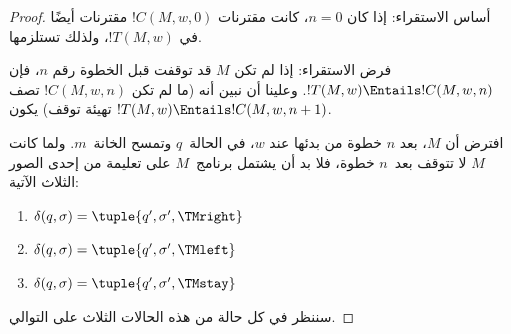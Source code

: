 \documentclass[../../../include/open-logic-section]{subfiles}
\begin{document}
\begin{proof}
أساس الاستقراء: إذا كان $n=0$، كانت مقترنات $!C(M,w,0)$ مقترنات
أيضًا في $!T(M,w)$، ولذلك تستلزمها.

فرض الاستقراء: إذا لم تكن $M$ قد توقفت قبل الخطوة رقم $n$، فإن
$!T(M,w)\Entails !C(M,w,n)$. وعلينا أن نبين أنه (ما لم تكن
$!C(M,w,n)$ تصف تهيئة توقف) يكون
$!T(M,w)\Entails !C(M,w,n+1)$.

افترض أن $M$، بعد $n$ خطوة من بدئها عند $w$، في الحالة~$q$ وتمسح
الخانة~$m$. ولما كانت $M$ لا تتوقف بعد~$n$ خطوة، فلا بد أن يشتمل
برنامج~$M$ على تعليمة من إحدى الصور الثلاث الآتية:

\begin{enumerate}
\item {} $\delta(q, \sigma) = \tuple{q', \sigma', \TMright}$

\item {} $\delta(q, \sigma) = \tuple{q', \sigma', \TMleft}$

\item {} $\delta(q, \sigma) = \tuple{q', \sigma', \TMstay}$
\end{enumerate}

سننظر في كل حالة من هذه الحالات الثلاث على التوالي.


\end{proof}
\end{document}
